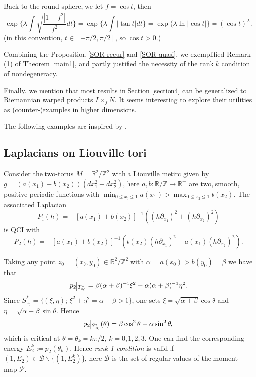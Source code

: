 \documentclass[12pt,reqno]{amsart}
\numberwithin{equation}{section}
\newenvironment{rem}{\medskip\noindent{\it Remark:\/} }{\medskip}
\begin{document}
\begin{rem}
Back to the round sphere, we let $f=\cos t$, then 
$$
\exp\{\lambda\int\sqrt{\frac{|1-f^2|}{f^2}}dt\}=\exp\{\lambda\int |\tan t|dt\}=\exp\{\lambda \ln|\cos t|\}=(\cos t)^{\lambda}. 
$$
(in this convention, $t\in [-\pi/2,\pi/2]$, so $\cos t>0$.)
\end{rem}

 
Combining the Proposition \ref{SOR recur} and \ref{SOR quasi}, we exemplified Remark (1) of Theorem \ref{main1}, and partly justified the necessity of the rank $k$ condition of nondegeneracy.

Finally, we mention that most results in Section \ref{section4} can be generalized to Riemannian warped products $I \times_fN$. It seems interesting to explore their utilities as (counter-)examples in higher dimensions.

The following examples are inspired by \cite{GT2020}.

\subsection{Laplacians on Liouville tori}

Consider the two-torus $M=\mathbb{R}^2/\mathbb{Z}^2$ with a Liouville metirc given by $g=(a(x_1)+b(x_2))(dx_1^2+dx_2^2)$, here $a, b:\mathbb{R}/\mathbb{Z}\to \mathbb{R}^+$ are two, smooth, positive periodic functions with $\min_{0\leq x_1\leq1} a(x_1)>\max_{0\leq x_2 \leq 1}b(x_2)$. The associated Laplacian $$P_1(h)=-[a(x_1)+b(x_2)]^{-1}((h\partial_{x_1})^2+(h\partial_{x_2})^2)$$ is QCI with $$P_2(h)=-[a(x_1)+b(x_2)]^{-1}(b(x_2)(h\partial_{x_1})^2-a(x_1)(h\partial_{x_2})^2).$$

Taking any point $z_0=(x_0, y_0)\in\mathbb{R}^2/\mathbb{Z}^2$ with $\alpha=a(x_0)>b(y_0)=\beta$ we have that $$p_2\vline_{\,T_{z_0}^*}=\beta(\alpha+\beta)^{-1}\xi^2- \alpha(\alpha+\beta)^{-1}\eta^2.$$
Since $S_{z_0}^*=\{(\xi,\eta);\, \xi^2+\eta^2=\alpha+\beta>0\}$, one sets $\xi=\sqrt{\alpha+\beta}\cos\theta$ and $\eta=\sqrt{\alpha+\beta}\sin\theta$. Hence $$p_2\vline_{\,S_{z_0}^*}(\theta)=\beta\cos^2\theta-\alpha\sin^2\theta,$$
which is critical at $\theta=\theta_k=k\pi/2$, $k=0,1,2,3$. One can find the corresponding energy $E_2^k:=p_2(\theta_k)$. Hence {\em rank 1 condition} is valid if $(1, E_2)\in \mathcal{B}\backslash\{(1,E_2^k)\}$, here $\mathcal{B}$ is the set of regular values of the moment map $\mathcal{P}$.
\end{document}
